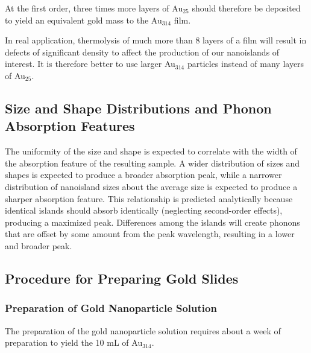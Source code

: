 \documentclass[12pt,oneside,english]{article}
\begin{document}
	At the first order, three times more layers of Au$_{25}$ should therefore be deposited to yield an equivalent gold mass to the Au$_{314}$ film.
	
	In real application, thermolysis of much more than 8 layers of a film will result in defects of significant density to affect the production of our nanoislands of interest.
	It is therefore better to use larger Au$_{314}$ particles instead of many layers of Au$_{25}$.

	\subsection{Size and Shape Distributions and Phonon Absorption Features}
	The uniformity of the size and shape is expected to correlate with the width of the absorption feature of the resulting sample.
	A wider distribution of sizes and shapes is expected to produce a broader absorption peak, while a narrower distribution of nanoisland sizes about the average size is expected to produce a sharper absorption feature.
	This relationship is predicted analytically because identical islands should absorb identically (neglecting second-order effects), producing a maximized peak.  
	Differences among the islands will create phonons that are offset by some amount from the peak wavelength, resulting in a lower and broader peak.
	
	
	\subsection{Procedure for Preparing Gold Slides}
	
	\subsubsection{Preparation of Gold Nanoparticle Solution}
	The preparation of the gold nanoparticle solution requires about a week of preparation to yield the 10 mL of Au$_{314}$.
	
\end{document}
